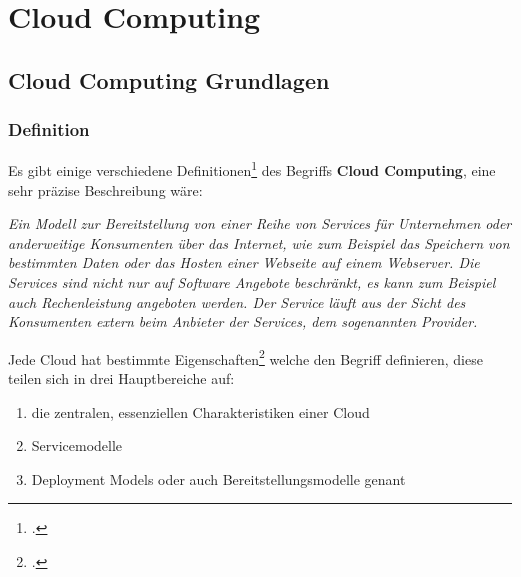 \chapter{Cloud Computing}
\putz
\section{Cloud Computing Grundlagen}
\subsection{Definition}
Es gibt einige verschiedene Definitionen\footcite{Lehrunterlagen-HTL-cloud} des Begriffs \textbf{Cloud Computing}, eine sehr präzise Beschreibung wäre:

\begin{center}
   \textit{Ein Modell zur Bereitstellung von einer Reihe von Services für Unternehmen oder anderweitige Konsumenten über das Internet, wie zum Beispiel das
	Speichern von bestimmten Daten oder das Hosten einer Webseite auf einem Webserver. Die Services sind nicht nur auf Software Angebote beschränkt, es kann zum Beispiel auch Rechenleistung
	angeboten werden. Der Service läuft aus der Sicht des Konsumenten extern beim Anbieter der Services, dem sogenannten Provider.}
\end{center}

Jede Cloud hat bestimmte Eigenschaften\footcite{cloud-servicemodelle} welche den Begriff definieren, diese teilen sich in drei Hauptbereiche auf:
\begin{enumerate}
	\item die zentralen, essenziellen Charakteristiken einer Cloud
	\item Servicemodelle
	\item Deployment Models oder auch Bereitstellungsmodelle genant
\end{enumerate}

